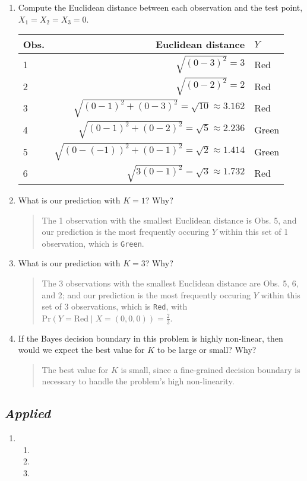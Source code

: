 \documentclass[11pt]{article}
\newenvironment{answer}{
\begin{quote}}{
\end{quote}}
\begin{document}
\begin{enumerate}
    \begin{enumerate}
      \item Compute the Euclidean distance between each observation
        and the test point, $X_1 = X_2 = X_3 = 0$.
        \begin{center}
          \begin{tabular}{l|rl}
            \hline
            Obs. & Euclidean distance & $Y$ \\
            \hline
            1 & $\sqrt{(0-3)^2}=3$ & Red \\
            2 & $\sqrt{(0-2)^2}=2$ & Red \\
            3 & $\sqrt{(0-1)^2 + (0-3)^2} = \sqrt{10} \approx 3.162$ & Red \\
            4 & $\sqrt{(0-1)^2 + (0-2)^2} = \sqrt{5} \approx 2.236$ & Green \\
            5 & $\sqrt{(0-(-1))^2 + (0-1)^2} = \sqrt{2} \approx
            1.414$ & Green \\
            6 & $\sqrt{3(0-1)^2} =\sqrt{3} \approx 1.732$ & Red \\
            \hline
          \end{tabular}
        \end{center}
      \item What is our prediction with $K = 1$? Why?
        \begin{answer}
          The 1 observation with the smallest Euclidean distance is
          Obs. 5, and our prediction is the most frequently occuring
          $Y$ within this set of 1 observation, which is \texttt{Green}.
        \end{answer}
      \item What is our prediction with $K = 3$? Why?
        \begin{answer}
          The 3 observations with the smallest Euclidean distance are
          Obs. 5, 6, and 2; and our prediction is the most frequently
          occuring $Y$ within this set of 3 observations, which is
          \texttt{Red}, with $\text{Pr}(Y=\text{Red} \mid
          X=(0,0,0))=\frac{2}{3}$.
        \end{answer}
      \item If the Bayes decision boundary in this problem is highly
        non-linear, then would we expect the best value for $K$ to be
        large or small? Why?
        \begin{answer}
            The best value for $K$ is small, since a fine-grained decision boundary is necessary to handle the problem's high non-linearity.
        \end{answer}
    \end{enumerate}

\end{enumerate}

\subsection*{\textit{Applied}}

\begin{enumerate}[resume]
  \item
    \begin{enumerate}
      \item
      \item
      \item
    \end{enumerate}
\end{enumerate}
\end{document}
